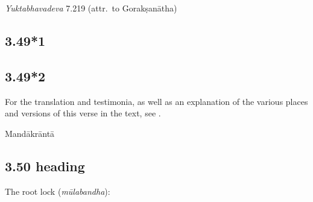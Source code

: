 \begin{ekdosis}
\begin{testimonia}[hp03_049]
\emph{Yuktabhavadeva} 7.219 (attr.~to Gorakṣanātha)
\begin{versinnote}
\end{versinnote}
\end{testimonia}


\subsection*{3.49*1}


\subsection*{3.49*2}

\begin{philcomm}[hp03_049_2]
For the translation and testimonia, as well as an explanation of the various places and versions of this verse in the text, see . 
\end{philcomm}


\begin{metre}[hp03_049_2]
Mandākrāntā 
\end{metre}

\subsection*{3.50 heading}
\begin{translation}[hp03_050a]
The root lock (\emph{mūlabandha}):
\end{translation}



\end{ekdosis}
